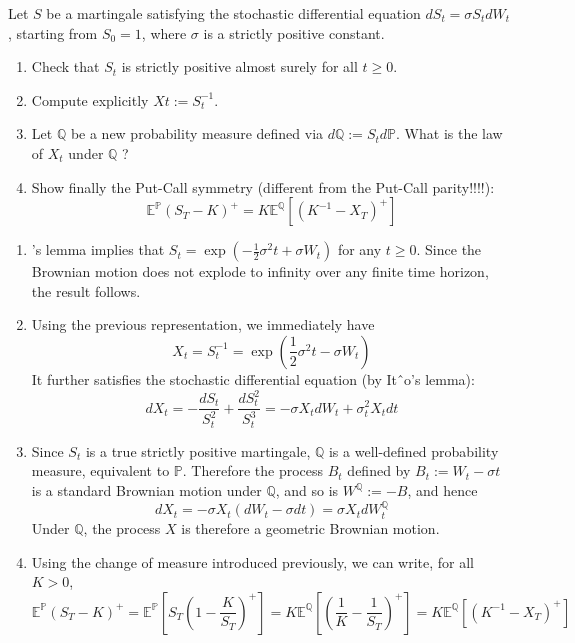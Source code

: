 \documentclass[12pt,a4paper]{exam}
\begin{document}
\begin{questions}
\question Let $S$ be a martingale satisfying the stochastic differential equation $dS_t = \sigma S_t dW_t$, starting from $S_0 = 1$,
where $\sigma$ is a strictly positive constant.
\begin{enumerate}[label=(\alph*),font=\itshape]
\item Check that $S_t$ is strictly positive almost surely for all $t \geq 0$.
\item Compute explicitly $Xt := S_t^{-1}$.
\item Let $\mathbb{Q}$ be a new probability measure defined via $d\mathbb{Q} := S_t d\mathbb{P}$. What is the law of $X_t$ under $\mathbb{Q}$ ? 
\item Show finally the Put-Call symmetry (different from the Put-Call parity!!!!):
\begin{equation*}
\mathbb{E}^{\mathbb{P}}(S_T-K)^+ = K\mathbb{E}^{\mathbb{Q}}\left[(K^{-1}-X_T)^+\right]
\end{equation*}
\end{enumerate}
\fillwithlines{3cm}

\begin{solution}
\begin{enumerate}[label=(\alpha*),font=\itshape]
\item \ito’s lemma implies that $S_t = \exp (-\frac{1}{2}\sigma^2 t + \sigma W_t)$ for any $t \geq 0$. Since the Brownian motion does not
explode to infinity over any finite time horizon, the result follows.
\item Using the previous representation, we immediately have
\begin{equation*}
X_t = S_t^{-1} = \exp\left(\frac{1}{2}\sigma^2 t - \sigma W_t\right)
\end{equation*}
It further satisfies the stochastic differential equation (by Itˆo’s lemma):
\begin{equation*}
dX_t = -\frac{dS_t}{S_t^2} + \frac{dS^2_t}{S_t^3} = -\sigma X_t dW_t + \sigma^2_t X_t dt
\end{equation*}
\item Since $S_t$ is a true strictly positive martingale, $\mathbb{Q}$ is a well-defined probability measure, equivalent to $\mathbb{P}$.
Therefore the process $B_t$ defined by $B_t := W_t - \sigma t$ is a standard Brownian motion under $\mathbb{Q}$, and so is $W^{\mathbb{Q}} := -B$, and hence 
\begin{equation*}
dX_t = -\sigma X_t(dW_t - \sigma dt) = \sigma X_t dW_t^{\mathbb{Q}}
\end{equation*}
Under $\mathbb{Q}$, the process $X$ is therefore a geometric Brownian motion.
\item Using the change of measure introduced previously, we can write, for all $K>0$,
\begin{equation*}
\mathbb{E}^{\mathbb{P}}(S_T-K)^+ = \mathbb{E}^{\mathbb{P}}\left[S_T\left(1-\frac{K}{S_T}\right)^+\right] = K \mathbb{E}^{\mathbb{Q}}\left[\left(\frac{1}{K}-\frac{1}{S_T}\right)^+\right] = K\mathbb{E}^{\mathbb{Q}}\left[(K^{-1}-X_T)^+\right]
\end{equation*}
\end{enumerate}
\end{solution}


\end{questions}
\end{document}
